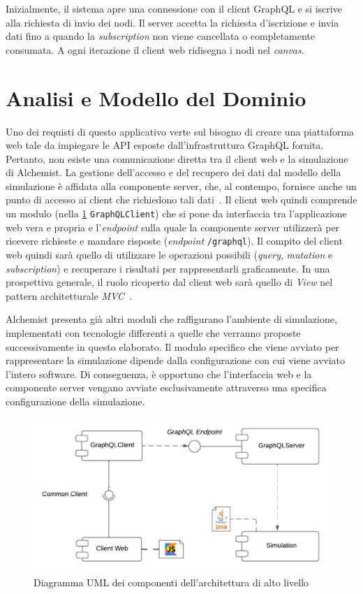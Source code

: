 Inizialmente, il sistema apre una connessione con il client GraphQL e si iscrive alla richiesta di invio dei nodi. Il server accetta la richiesta d'iscrizione e invia dati fino a quando la \textit{subscription} non viene cancellata o completamente consumata. A ogni iterazione il client web ridisegna i nodi nel \textit{canvas}.
\section{Analisi e Modello del Dominio}
Uno dei requisti di questo applicativo verte sul bisogno di creare una piattaforma web tale da impiegare le \ac{API} esposte dall'infrastruttura GraphQL fornita. Pertanto, non esiste una comunicazione diretta tra il client web e la simulazione di Alchemist. La gestione dell'accesso e del recupero dei dati dal modello della simulazione è affidata alla componente server, che, al contempo, fornisce anche un punto di accesso ai client che richiedono tali dati~\cite{amslaurea30280}.
Il client web quindi comprende un modulo (nella \cref{fig:domain-model} \texttt{GraphQLClient}) che si pone da interfaccia tra l'applicazione web vera e propria e l'\textit{endpoint} sulla quale la componente server utilizzerà per ricevere richieste e mandare risposte (\textit{endpoint} \texttt{/graphql}). 
Il compito del client web quindi sarà quello di utilizzare le operazioni possibili (\textit{query}, \textit{mutation} e \textit{subscription}) e recuperare i risultati per rappresentarli graficamente. In una prospettiva generale, il ruolo ricoperto dal client web sarà quello di \textit{View} nel pattern architetturale \textit{ \ac{MVC}}~\cite{Gamma1994}.

Alchemist presenta già altri moduli che raffigurano l'ambiente di simulazione, implementati con tecnologie differenti a quelle che verranno proposte successivamente in questo elaborato. Il modulo specifico che viene avviato per rappresentare la simulazione dipende dalla configurazione con cui viene avviato l'intero software. Di conseguenza, è opportuno che l'interfaccia web e la componente server vengano avviate esclusivamente attraverso una specifica configurazione della simulazione.

\begin{figure}[htb]
	\centering
	\includegraphics[width=.8\linewidth]{imgs/domain_model.pdf}
	\caption{Diagramma UML dei componenti dell’architettura di alto livello}
	\label{fig:domain-model}
\end{figure}



